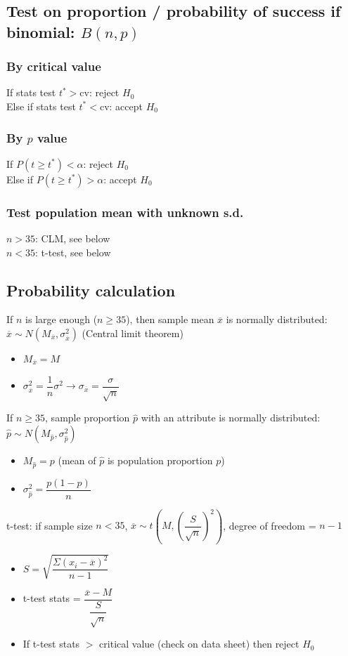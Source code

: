 \documentclass[A4paper, 11pt]{article}
\begin{document}
	\subsection{Test on proportion / probability of success if binomial: $B(n,p)$}
	\subsubsection{By critical value}
	If stats test $t^* > \text{cv}$: reject $H_0$\\
	Else if stats test $t^* < \text{cv}$: accept $H_0$
	
	\subsubsection{By $p$ value}
	If $P(t\geq t^*) < \alpha$: reject $H_0$\\
	Else if $P(t \geq t^*) > \alpha$: accept $H_0$
	
	\subsubsection{Test population mean with unknown s.d.}
	$n>35$: CLM, see below\\
	$n<35$: t-test, see below
	
	\subsection{Probability calculation}
	If $n$ is large enough ($n\geq35$), then sample mean $\overline{x}$ is normally distributed: $\overline{x} \sim N(M_{\overline{x}}, \sigma_{\overline{x}}^2)$ (Central limit theorem)
	\begin{itemize}
		\item $M_{\overline{x}}=M$
		\item $\sigma_{\overline{x}}^2=\dfrac{1}{n}\sigma^2 \rightarrow \sigma_{\overline{x}} = \dfrac{\sigma}{\sqrt{n}}$
	\end{itemize}
	If $n\geq35$, sample proportion $\hat{p}$ with an attribute is normally distributed: $\hat{p}\sim N(M_{\hat{p}}, \sigma_{\hat{p}}^2)$
	\begin{itemize}
		\item $M_{\hat{p}}=p$ (mean of $\hat{p}$ is population proportion $p$)
		\item $\sigma_{\hat{p}}^2=\dfrac{p(1-p)}{n}$
	\end{itemize}
	t-test: if sample size $n<35$, $\overline{x} \sim t(M, (\dfrac{S}{\sqrt{n}})^2)$, degree of freedom = $n-1$
	\begin{itemize}
		\item $S=\sqrt{\dfrac{\Sigma (x_i-\overline{x})^2}{n-1}}$
		\item t-test stats = $\dfrac{\overline{x}-M}{\dfrac{S}{\sqrt{n}}}$
		\item If t-test stats $>$ critical value (check on data sheet) then reject $H_0$
	\end{itemize}
	
\end{document}
